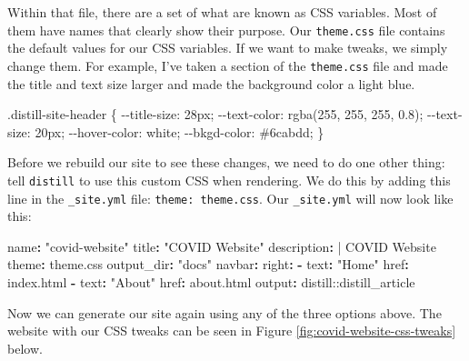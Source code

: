 \documentclass[
]{book}
\newenvironment{Shaded}{\begin{snugshade}}{\end{snugshade}}
\newcommand{\AttributeTok}[1]{\textcolor[rgb]{0.77,0.63,0.00}{#1}}
\newcommand{\CharTok}[1]{\textcolor[rgb]{0.31,0.60,0.02}{#1}}
\newcommand{\FunctionTok}[1]{\textcolor[rgb]{0.00,0.00,0.00}{#1}}
\newcommand{\KeywordTok}[1]{\textcolor[rgb]{0.13,0.29,0.53}{\textbf{#1}}}
\newcommand{\NormalTok}[1]{#1}
\newcommand{\StringTok}[1]{\textcolor[rgb]{0.31,0.60,0.02}{#1}}
\begin{document}
Within that file, there are a set of what are known as CSS variables. Most of them have names that clearly show their purpose. Our \texttt{theme.css} file contains the default values for our CSS variables. If we want to make tweaks, we simply change them. For example, I've taken a section of the \texttt{theme.css} file and made the title and text size larger and made the background color a light blue.

\begin{Shaded}
\begin{Highlighting}[]
\NormalTok{.distill{-}site{-}header \{}
\NormalTok{  {-}{-}title{-}size:       28px;}
\NormalTok{  {-}{-}text{-}color:       rgba(255, 255, 255, 0.8);}
\NormalTok{  {-}{-}text{-}size:        20px;}
\NormalTok{  {-}{-}hover{-}color:      white;}
\NormalTok{  {-}{-}bkgd{-}color:       \#6cabdd;}
\NormalTok{\}}
\end{Highlighting}
\end{Shaded}

Before we rebuild our site to see these changes, we need to do one other thing: tell \texttt{distill} to use this custom CSS when rendering. We do this by adding this line in the \texttt{\_site.yml} file: \texttt{theme:\ theme.css}. Our \texttt{\_site.yml} will now look like this:

\begin{Shaded}
\begin{Highlighting}[]
\FunctionTok{name}\KeywordTok{:}\AttributeTok{ }\StringTok{"covid{-}website"}
\FunctionTok{title}\KeywordTok{:}\AttributeTok{ }\StringTok{"COVID Website"}
\FunctionTok{description}\KeywordTok{: }\CharTok{|}
\NormalTok{  COVID Website}
\FunctionTok{theme}\KeywordTok{:}\AttributeTok{ theme.css}
\FunctionTok{output\_dir}\KeywordTok{:}\AttributeTok{ }\StringTok{"docs"}
\FunctionTok{navbar}\KeywordTok{:}
\AttributeTok{  }\FunctionTok{right}\KeywordTok{:}
\AttributeTok{    }\KeywordTok{{-}}\AttributeTok{ }\FunctionTok{text}\KeywordTok{:}\AttributeTok{ }\StringTok{"Home"}
\AttributeTok{      }\FunctionTok{href}\KeywordTok{:}\AttributeTok{ index.html}
\AttributeTok{    }\KeywordTok{{-}}\AttributeTok{ }\FunctionTok{text}\KeywordTok{:}\AttributeTok{ }\StringTok{"About"}
\AttributeTok{      }\FunctionTok{href}\KeywordTok{:}\AttributeTok{ about.html}
\FunctionTok{output}\KeywordTok{:}\AttributeTok{ distill::distill\_article}
\end{Highlighting}
\end{Shaded}

Now we can generate our site again using any of the three options above. The website with our CSS tweaks can be seen in Figure \ref{fig:covid-website-css-tweaks} below.
\end{document}

